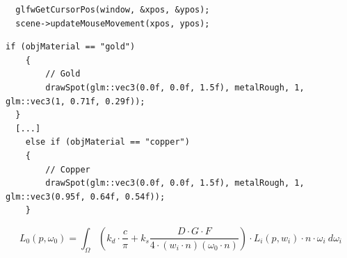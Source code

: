\documentclass[
  11pt,
  a4paper,
  oneside
  ]{article}
\begin{document}
\begin{lstlisting}
  glfwGetCursorPos(window, &xpos, &ypos);
  scene->updateMouseMovement(xpos, ypos);
\end{lstlisting}
\begin{lstlisting}[tabsize=2]
  if (objMaterial == "gold")
	{
		// Gold
		drawSpot(glm::vec3(0.0f, 0.0f, 1.5f), metalRough, 1, glm::vec3(1, 0.71f, 0.29f));
  }
  [...]  
	else if (objMaterial == "copper")
	{
		// Copper
		drawSpot(glm::vec3(0.0f, 0.0f, 1.5f), metalRough, 1, glm::vec3(0.95f, 0.64f, 0.54f));
	}
\end{lstlisting}

\[ L_{0}\left( p,\omega _{0}\right) =\int _{\Omega }^{}\left( k_{d}\cdot \dfrac{c}{\pi }+k_{s}\dfrac{D\cdot G\cdot F}{4\cdot \left( w_{i}\cdot n\right) \left( \omega _{0}\cdot n\right) }\right) \cdot L_{i}\left( p,w_{i}\right) \cdot n\cdot \omega _{i} \ d\omega _{i}\] %









\end{document}
